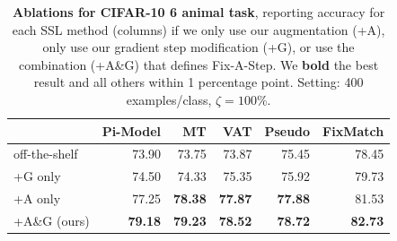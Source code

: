 \setlength{\tabcolsep}{.08cm}
\begin{table}[!t]
\centering
\begin{tabular}{l | r  r  r  r r}
& Pi-Model & MT & VAT & Pseudo & FixMatch
\\ \hline
off-the-shelf &
	73.90 & 73.75 & 73.87 & 75.45 & 78.45
\\
+G only &
	74.50 & 74.33 & 75.35 & 75.92 & 79.73
\\
+A only &
	77.25 & \textbf{78.38} & \textbf{77.87} & \textbf{77.88} & 81.53
\\
+A\&G (ours) &
	\textbf{79.18} & \textbf{79.23} & \textbf{78.52} & \textbf{78.72} & \textbf{82.73}

\end{tabular}
    \caption{
    \textbf{Ablations for CIFAR-10 6 animal task}, reporting accuracy for each SSL method (columns) if we only use our augmentation (+A), only use our gradient step modification (+G), or use the combination (+A\&G) that defines Fix-A-Step.
    We \textbf{bold} the best result and all others within 1 percentage point.
    Setting: 400 examples/class, $\zeta=100\%$.
}%
    \label{tab:results_cifar10_ablation}
\end{table}

